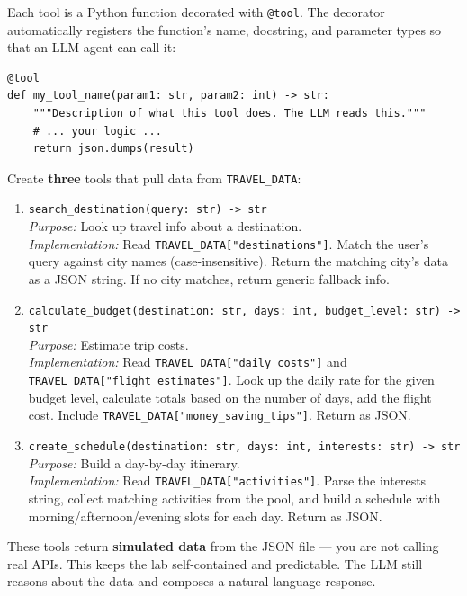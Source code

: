 \documentclass[11pt, letterpaper]{article}
\begin{document}
Each tool is a Python function decorated with \texttt{@tool}. The decorator automatically registers the function's name, docstring, and parameter types so that an LLM agent can call it:

\begin{lstlisting}
@tool
def my_tool_name(param1: str, param2: int) -> str:
    """Description of what this tool does. The LLM reads this."""
    # ... your logic ...
    return json.dumps(result)
\end{lstlisting}

\noindent Create \textbf{three} tools that pull data from \texttt{TRAVEL\_DATA}:

\begin{enumerate}
  \item \texttt{search\_destination(query: str) -> str}\\
    \textit{Purpose:} Look up travel info about a destination.\\
    \textit{Implementation:} Read \texttt{TRAVEL\_DATA["destinations"]}. Match the user's query against city names (case-insensitive). Return the matching city's data as a JSON string. If no city matches, return generic fallback info.

  \item \texttt{calculate\_budget(destination: str, days: int, budget\_level: str) -> str}\\
    \textit{Purpose:} Estimate trip costs.\\
    \textit{Implementation:} Read \texttt{TRAVEL\_DATA["daily\_costs"]} and \texttt{TRAVEL\_DATA["flight\_estimates"]}. Look up the daily rate for the given budget level, calculate totals based on the number of days, add the flight cost. Include \texttt{TRAVEL\_DATA["money\_saving\_tips"]}. Return as JSON.

  \item \texttt{create\_schedule(destination: str, days: int, interests: str) -> str}\\
    \textit{Purpose:} Build a day-by-day itinerary.\\
    \textit{Implementation:} Read \texttt{TRAVEL\_DATA["activities"]}. Parse the interests string, collect matching activities from the pool, and build a schedule with morning/afternoon/evening slots for each day. Return as JSON.
\end{enumerate}

\begin{tipbox}
These tools return \textbf{simulated data} from the JSON file --- you are not calling real APIs. This keeps the lab self-contained and predictable. The LLM still reasons about the data and composes a natural-language response.
\end{tipbox}
\end{document}
